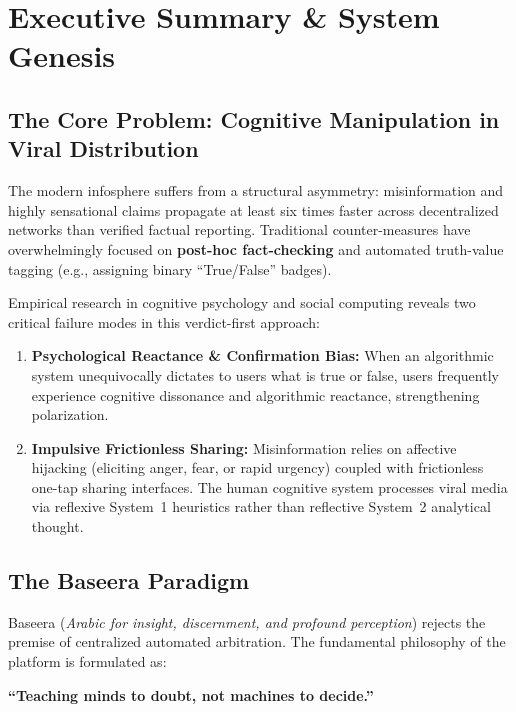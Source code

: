 \documentclass[11pt,a4paper]{report}
\begin{document}
\tableofcontents
\newpage

\chapter{Executive Summary \& System Genesis}

\section{The Core Problem: Cognitive Manipulation in Viral Distribution}
The modern infosphere suffers from a structural asymmetry: misinformation and highly sensational claims propagate at least six times faster across decentralized networks than verified factual reporting. Traditional counter-measures have overwhelmingly focused on \textbf{post-hoc fact-checking} and automated truth-value tagging (e.g., assigning binary ``True/False'' badges). 

Empirical research in cognitive psychology and social computing reveals two critical failure modes in this verdict-first approach:
\begin{enumerate}[label=\textbf{\arabic*.}]
    \item \textbf{Psychological Reactance \& Confirmation Bias:} When an algorithmic system unequivocally dictates to users what is true or false, users frequently experience cognitive dissonance and algorithmic reactance, strengthening polarization.
    \item \textbf{Impulsive Frictionless Sharing:} Misinformation relies on affective hijacking (eliciting anger, fear, or rapid urgency) coupled with frictionless one-tap sharing interfaces. The human cognitive system processes viral media via reflexive System~1 heuristics rather than reflective System~2 analytical thought.
\end{enumerate}

\section{The Baseera Paradigm}
Baseera (\textit{Arabic for insight, discernment, and profound perception}) rejects the premise of centralized automated arbitration. The fundamental philosophy of the platform is formulated as:
\begin{center}
    \textbf{``Teaching minds to doubt, not machines to decide.''}
\end{center}
\end{document}
